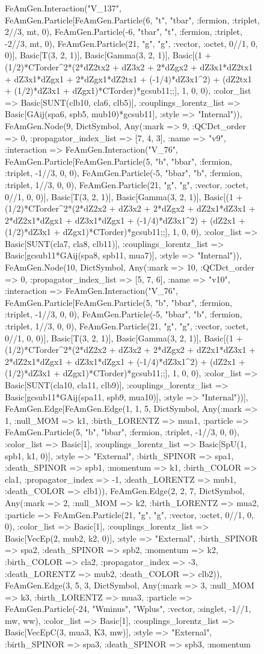 \documentclass{revtex4}
\begin{document}
\begin{figure}[!htb]
\begin{center}
{FeAmGen.Interaction("V_137", FeAmGen.Particle[FeAmGen.Particle(6, "t", "tbar", :fermion, :triplet, 2//3, mt, 0), FeAmGen.Particle(-6, "tbar", "t", :fermion, :triplet, -2//3, mt, 0), FeAmGen.Particle(21, "g", "g", :vector, :octet, 0//1, 0, 0)], Basic[T(3, 2, 1)], Basic[Gamma(3, 2, 1)], Basic[(1 + (1/2)*CTorder^2*(2*dZ2tx2 + dZ3x2 + 2*dZgx2 + dZ3x1*dZ2tx1 + dZ3x1*dZgx1 + 2*dZgx1*dZ2tx1 + (-1/4)*dZ3x1^2) + (dZ2tx1 + (1/2)*dZ3x1 + dZgx1)*CTorder)*gcsub11;;], 1, 0, 0), :color_list => Basic[SUNT(clb10, cla6, clb5)], :couplings_lorentz_list => Basic[GAij(spa6, spb5, mub10)*gcsub11], :style => "Internal")), FeAmGen.Node(9, Dict{Symbol, Any}(:mark => 9, :QCDct_order => 0, :propagator_index_list => [7, 4, 3], :name => "v9", :interaction => FeAmGen.Interaction("V_76", FeAmGen.Particle[FeAmGen.Particle(5, "b", "bbar", :fermion, :triplet, -1//3, 0, 0), FeAmGen.Particle(-5, "bbar", "b", :fermion, :triplet, 1//3, 0, 0), FeAmGen.Particle(21, "g", "g", :vector, :octet, 0//1, 0, 0)], Basic[T(3, 2, 1)], Basic[Gamma(3, 2, 1)], Basic[(1 + (1/2)*CTorder^2*(2*dZ2x2 + dZ3x2 + 2*dZgx2 + dZ2x1*dZ3x1 + 2*dZ2x1*dZgx1 + dZ3x1*dZgx1 + (-1/4)*dZ3x1^2) + (dZ2x1 + (1/2)*dZ3x1 + dZgx1)*CTorder)*gcsub11;;], 1, 0, 0), :color_list => Basic[SUNT(cla7, cla8, clb11)], :couplings_lorentz_list => Basic[gcsub11*GAij(spa8, spb11, mua7)], :style => "Internal")), FeAmGen.Node(10, Dict{Symbol, Any}(:mark => 10, :QCDct_order => 0, :propagator_index_list => [5, 7, 6], :name => "v10", :interaction => FeAmGen.Interaction("V_76", FeAmGen.Particle[FeAmGen.Particle(5, "b", "bbar", :fermion, :triplet, -1//3, 0, 0), FeAmGen.Particle(-5, "bbar", "b", :fermion, :triplet, 1//3, 0, 0), FeAmGen.Particle(21, "g", "g", :vector, :octet, 0//1, 0, 0)], Basic[T(3, 2, 1)], Basic[Gamma(3, 2, 1)], Basic[(1 + (1/2)*CTorder^2*(2*dZ2x2 + dZ3x2 + 2*dZgx2 + dZ2x1*dZ3x1 + 2*dZ2x1*dZgx1 + dZ3x1*dZgx1 + (-1/4)*dZ3x1^2) + (dZ2x1 + (1/2)*dZ3x1 + dZgx1)*CTorder)*gcsub11;;], 1, 0, 0), :color_list => Basic[SUNT(cla10, cla11, clb9)], :couplings_lorentz_list => Basic[gcsub11*GAij(spa11, spb9, mua10)], :style => "Internal"))], FeAmGen.Edge[FeAmGen.Edge(1, 1, 5, Dict{Symbol, Any}(:mark => 1, :null_MOM => k1, :birth_LORENTZ => mua1, :particle => FeAmGen.Particle(5, "b", "bbar", :fermion, :triplet, -1//3, 0, 0), :color_list => Basic[1], :couplings_lorentz_list => Basic[SpU(1, spb1, k1, 0)], :style => "External", :birth_SPINOR => spa1, :death_SPINOR => spb1, :momentum => k1, :birth_COLOR => cla1, :propagator_index => -1, :death_LORENTZ => mub1, :death_COLOR => clb1)), FeAmGen.Edge(2, 2, 7, Dict{Symbol, Any}(:mark => 2, :null_MOM => k2, :birth_LORENTZ => mua2, :particle => FeAmGen.Particle(21, "g", "g", :vector, :octet, 0//1, 0, 0), :color_list => Basic[1], :couplings_lorentz_list => Basic[VecEp(2, mub2, k2, 0)], :style => "External", :birth_SPINOR => spa2, :death_SPINOR => spb2, :momentum => k2, :birth_COLOR => cla2, :propagator_index => -3, :death_LORENTZ => mub2, :death_COLOR => clb2)), FeAmGen.Edge(3, 5, 3, Dict{Symbol, Any}(:mark => 3, :null_MOM => k3, :birth_LORENTZ => mua3, :particle => FeAmGen.Particle(-24, "Wminus", "Wplus", :vector, :singlet, -1//1, mw, ww), :color_list => Basic[1], :couplings_lorentz_list => Basic[VecEpC(3, mua3, K3, mw)], :style => "External", :birth_SPINOR => spa3, :death_SPINOR => spb3, :momentum }
\end{center}
\end{figure}
\end{document}
